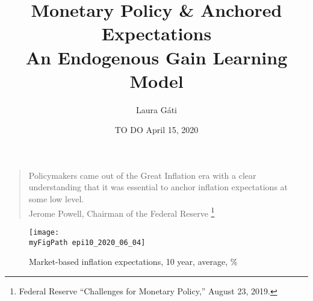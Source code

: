\documentclass[11pt]{beamer}
\author[]{Laura G\'ati}
\institute[]{Boston College}
\title[]{Monetary Policy \& Anchored Expectations \\
An Endogenous Gain Learning Model}
\date[]{TO DO April 15, 2020}
\def \myFigPath {../../../figures/}
\def\myTinyFigScale{0.16}
\begin{document}
\begin{frame}[plain] %

\maketitle

\end{frame}




\begin{frame}
	
\begin{quote}
Policymakers came out of the Great Inflation era with a clear understanding that it was essential to anchor inflation expectations at some low level. \\
Jerome Powell, Chairman of the Federal Reserve \footnote{Federal Reserve ``Challenges for Monetary Policy,''  August 23, 2019.}
\end{quote}	

\begin{figure}[h!]
\texttt{[image: \\myFigPath epi10\_2020\_06\_04]}
\caption{Market-based inflation expectations, 10 year, average, \%}
\label{epi}
\end{figure}


\end{frame}
\end{document}
